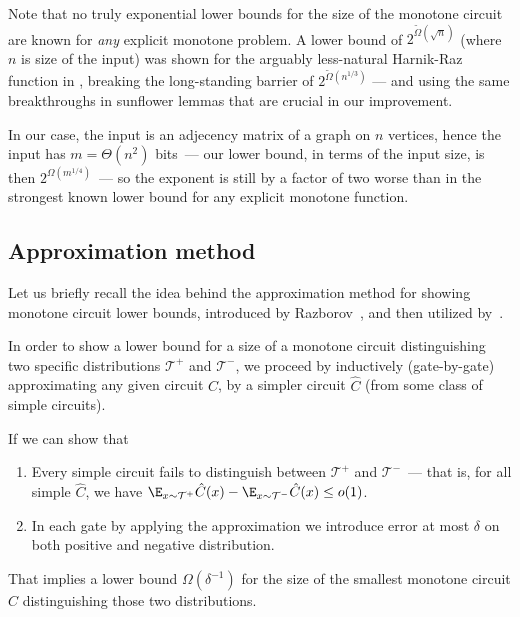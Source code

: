 Note that no truly exponential lower bounds for the size of the monotone circuit are known for \emph{any} explicit monotone problem. A lower bound of $2^{\tilde\Omega(\sqrt{n})}$  (where $n$ is size of the input) was shown for the arguably less-natural Harnik-Raz function \cite{harnik00lower} in \cite{cavalar2022}, breaking the long-standing barrier of $2^{\tilde{\Omega}(n^{1/3})}$ --- and using the same breakthroughs in sunflower lemmas that are crucial in our improvement.

In our case, the input is an adjecency matrix of a graph on $n$ vertices, hence the input has $m = \Theta(n^2)$ bits~--- our lower bound, in terms of the input size, is then $2^{\Omega(m^{1/4})}$~--- so the exponent is still by a factor of two worse than in the strongest known lower bound for any explicit monotone function.
\subsection{Approximation method \label{sec:intro-approx-method}}
Let us briefly recall the idea behind the approximation method for showing monotone circuit lower bounds, introduced by Razborov~\cite{razborov1985lower}, and then utilized by~\cite{alon87,cavalar2022}.

In order to show a lower bound for a size of a monotone circuit distinguishing two specific distributions $\mathcal{T}^+$ and $\mathcal{T}^-$, we proceed by inductively (gate-by-gate) approximating any given circuit $C$, by a simpler circuit $\hat{C}$ (from some class of simple circuits).

If we can show that
\begin{enumerate}
    \item Every simple circuit fails to distinguish between $\mathcal{T}^+$ and $\mathcal{T}^-$~--- that is, for all simple $\hat{C}$, we have $\E_{x \sim \mathcal{T}^+}\hat{C}(x) - \E_{x\sim \mathcal{T}^-}\hat{C}(x) \leq o(1)$.
    \item In each gate by applying the approximation we introduce error at most $\delta$ on both positive and negative distribution.
\end{enumerate}
That implies a lower bound $\Omega(\delta^{-1})$ for the size of the smallest monotone circuit $C$ distinguishing those two distributions.

